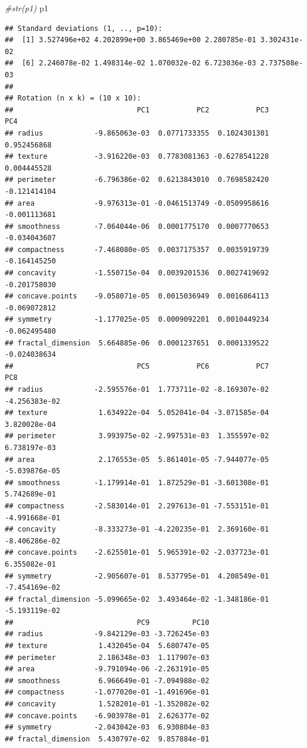\documentclass[
  11pt,
]{article}
\newenvironment{Shaded}{\begin{snugshade}}{\end{snugshade}}
\newcommand{\CommentTok}[1]{\textcolor[rgb]{0.56,0.35,0.01}{\textit{#1}}}
\newcommand{\NormalTok}[1]{#1}
\begin{document}
\begin{Shaded}
\begin{Highlighting}[]
\CommentTok{\#str(p1)}
\NormalTok{p1}
\end{Highlighting}
\end{Shaded}

\begin{verbatim}
## Standard deviations (1, .., p=10):
##  [1] 3.527496e+02 4.202899e+00 3.865469e+00 2.280785e-01 3.302431e-02
##  [6] 2.246078e-02 1.498314e-02 1.070032e-02 6.723036e-03 2.737508e-03
## 
## Rotation (n x k) = (10 x 10):
##                             PC1           PC2           PC3          PC4
## radius            -9.865063e-03  0.0771733355  0.1024301301  0.952456868
## texture           -3.916220e-03  0.7783081363 -0.6278541228  0.004445528
## perimeter         -6.796386e-02  0.6213843010  0.7698582420 -0.121414104
## area              -9.976313e-01 -0.0461513749 -0.0509958616 -0.001113681
## smoothness        -7.064044e-06  0.0001775170  0.0007770653 -0.034043607
## compactness       -7.468080e-05  0.0037175357  0.0035919739 -0.164145250
## concavity         -1.550715e-04  0.0039201536  0.0027419692 -0.201758030
## concave.points    -9.058071e-05  0.0015036949  0.0016864113 -0.069072812
## symmetry          -1.177025e-05  0.0009092201  0.0010449234 -0.062495480
## fractal_dimension  5.664885e-06  0.0001237651  0.0001339522 -0.024038634
##                             PC5           PC6           PC7           PC8
## radius            -2.595576e-01  1.773711e-02 -8.169307e-02 -4.256383e-02
## texture            1.634922e-04  5.052041e-04 -3.071585e-04  3.820028e-04
## perimeter          3.993975e-02 -2.997531e-03  1.355597e-02  6.738197e-03
## area               2.176553e-05  5.861401e-05 -7.944077e-05 -5.039876e-05
## smoothness        -1.179914e-01  1.872529e-01 -3.601308e-01  5.742689e-01
## compactness       -2.583014e-01  2.297613e-01 -7.553151e-01 -4.991668e-01
## concavity         -8.333273e-01 -4.220235e-01  2.369160e-01 -8.406286e-02
## concave.points    -2.625501e-01  5.965391e-02 -2.037723e-01  6.355082e-01
## symmetry          -2.905607e-01  8.537795e-01  4.208549e-01 -7.454169e-02
## fractal_dimension -5.099665e-02  3.493464e-02 -1.348186e-01 -5.193119e-02
##                             PC9          PC10
## radius            -9.842129e-03 -3.726245e-03
## texture            1.432045e-04  5.680747e-05
## perimeter          2.186348e-03  1.117907e-03
## area              -9.791094e-06 -2.263191e-05
## smoothness         6.966649e-01 -7.094988e-02
## compactness       -1.077020e-01 -1.491696e-01
## concavity          1.528201e-01 -1.352082e-02
## concave.points    -6.903978e-01  2.626377e-02
## symmetry          -2.043042e-03  6.930804e-03
## fractal_dimension  5.430797e-02  9.857884e-01
\end{verbatim}
\end{document}
